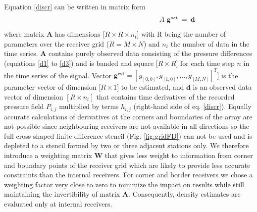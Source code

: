 \documentclass{article}
\begin{document}
	Equation \eqref{discr} can be written in matrix form
	\begin{align}
	\shoveright \shoveright \shoveright \shoveright \shoveright \shoveright \shoveright \shoveright \shoveright \shoveright \shoveright \shoveright \shoveright \shoveright \shoveright
 			 \mathbf{A} \; \mathbf{g}^{est} &\: = \: \mathbf{d}
	\end{align}
	where matrix \textbf{A} has dimensions [$R \times R \times n_{t}$] with R being the number of parameters over the receiver grid ($R=M \times N$) and $n_{t}$ the number of data in the time series. \textbf{A} contains purely observed data consisting of the pressure differences (equations \ref{d1} to \ref{d3}) and is banded and square [$R \times R$] for each time step $n$ in the time series of the signal. Vector $ \mathbf{g^{est}} = [g_{[0,0]}, g_{[1,0]},..., g_{[M,N]}]^{T}]$ is the parameter vector of dimension [$R \times 1$] to be estimated, and $\mathbf{d}$ is an observed data vector of dimension $[R \times n_{t}]$ that contains time derivatives of the recorded pressure field $P_{i,j}$ multiplied by terms $h_{i,j}$ (right-hand side of eq. \ref{discr}). Equally accurate calculations of derivatives at the corners and boundaries of the array are not possible since neighbouring receivers are not available in all directions so the full cross-shaped finite difference stencil (Fig. \ref{fig:gridFD}) can not be used and is depleted to a stencil formed by two or three adjacent stations only. %
	We therefore introduce a weighting matrix $\mathbf{W}$ that gives less weight to information from corner and boundary points of the receiver grid which are likely to provide less accurate constraints than the internal receivers. For corner and border receivers we chose a weighting factor very close to zero to minimize the impact on results while still maintaining the invertibility of matrix $\mathbf{A}$. Consequently, density estimates are evaluated only at internal receivers. \\
	
\end{document}
